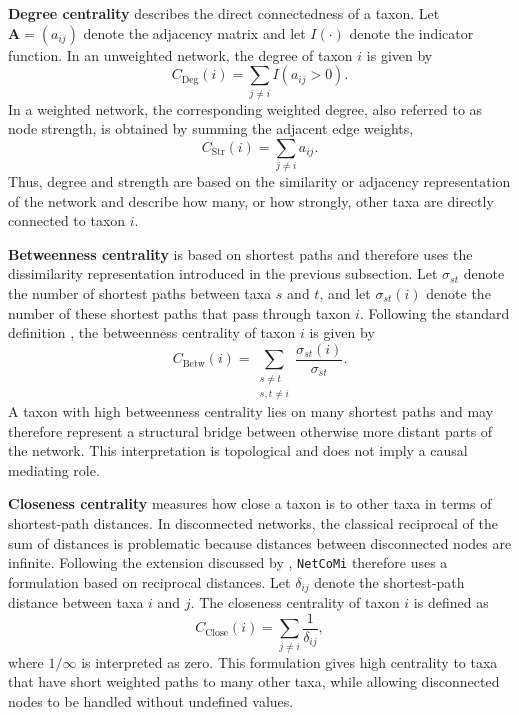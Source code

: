 \textbf{Degree centrality} describes the direct connectedness of a taxon. Let $\mathbf{A}=(a_{ij})$ denote the adjacency matrix and let $I(\cdot)$ denote the indicator function. In an unweighted network, the degree of taxon $i$ is given by
\begin{equation}
\label{eq:5net:net_analysis:degree}
C_{\mathrm{Deg}}(i) = \sum_{j\neq i} I(a_{ij} > 0).
\end{equation}
In a weighted network, the corresponding weighted degree, also referred to as node strength, is obtained by summing the adjacent edge weights,
\begin{equation}
\label{eq:5net:net_analysis:strength}
C_{\mathrm{Str}}(i) = \sum_{j\neq i} a_{ij}.
\end{equation}
Thus, degree and strength are based on the similarity or adjacency representation of the network and describe how many, or how strongly, other taxa are directly connected to taxon $i$.

\textbf{Betweenness centrality} is based on shortest paths and therefore uses the dissimilarity representation introduced in the previous subsection. Let $\sigma_{st}$ denote the number of shortest paths between taxa $s$ and $t$, and let $\sigma_{st}(i)$ denote the number of these shortest paths that pass through taxon $i$. Following the standard definition \citep{brandes2001faster}, the betweenness centrality of taxon $i$ is given by
\begin{equation}
\label{eq:5net:net_analysis:betweenness}
C_{\mathrm{Betw}}(i) =
\sum_{\substack{s\neq t\\ s,t\neq i}}\frac{\sigma_{st}(i)}{\sigma_{st}}.
\end{equation}
A taxon with high betweenness centrality lies on many shortest paths and may therefore represent a structural bridge between otherwise more distant parts of the network. This interpretation is topological and does not imply a causal mediating role.

\textbf{Closeness centrality} measures how close a taxon is to other taxa in terms of shortest-path distances. In disconnected networks, the classical reciprocal of the sum of distances \citep{brandes2001faster} is problematic because distances between disconnected nodes are infinite. Following the extension discussed by \citet{opsahl2010node}, \texttt{NetCoMi} therefore uses a formulation based on reciprocal distances. Let $\delta_{ij}$ denote the shortest-path distance between taxa $i$ and $j$. The closeness centrality of taxon $i$ is defined as
\begin{equation}
\label{eq:5net:net_analysis:closeness}
C_{\mathrm{Close}}(i) = \sum_{j\neq i} \frac{1}{\delta_{ij}},
\end{equation}
where $1/\infty$ is interpreted as zero. This formulation gives high centrality to taxa that have short weighted paths to many other taxa, while allowing disconnected nodes to be handled without undefined values.

